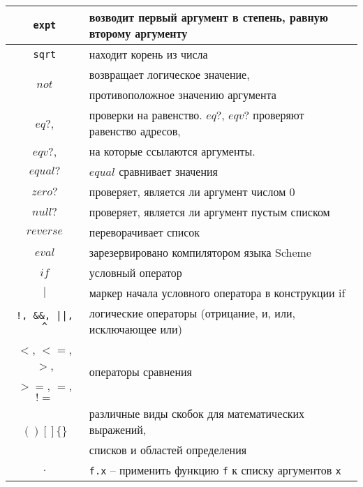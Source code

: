 \begin{itemize}
\begin{table}[ht!]
\begin{tabular}{|c|l|}
                        \verb!expt!                 & возводит первый аргумент в степень, равную второму аргументу \\ \hline
                        \verb!sqrt!                 & находит корень из числа \\ \hline
                        \multirow{2}{*}{$not$}      & возвращает логическое значение,\\
                                                    & противоположное значению аргумента \\ \hline
                        $eq?$,                      & проверки на равенство. $eq?$, $eqv?$ проверяют равенство адресов,\\
                        $eqv?$,                     & на которые ссылаются аргументы.\\
                        $equal?$                    & $equal$ сравнивает значения \\ \hline
                        $zero?$                     & проверяет, является ли аргумент числом 0 \\ \hline
                        $null?$                     & проверяет, является ли аргумент пустым списком \\ \hline
                        $reverse$                   & переворачивает список \\ \hline
                        $eval$                      & зарезервировано компилятором языка Scheme \\ \hline
                        $if$                        & условный оператор \\ \hline
                        $|$                         & маркер начала условного оператора в конструкции if \\ \hline
                        \verb$!, &&, ||, ^$         & логические операторы (отрицание, и, или, исключающее или) \\ \hline
                        $<$, $<=$, $>$,             & \multirow{2}{*}{операторы сравнения} \\
                        $>=$, $=$, $!=$             & \\ \hline
                        \multirow{2}{*}{$( ) [ ] \{ \}$} & различные виды скобок для математических выражений,\\
                                                    & списков и областей определения \\ \hline
                        $.$                         & \verb,f.x, -- применить функцию \verb,f, к списку аргументов \verb,x, \\ \hline

\end{tabular}
\end{table}
\end{itemize}
